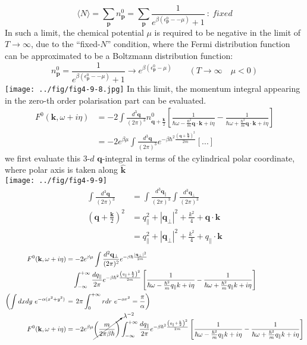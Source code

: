 \[
\langle N\rangle=\sum_{\mathbf p} n^0_{\mathbf p}=\sum_{\mathbf p}\frac{1}{e^{\beta(\epsilon^0_{\mathbf p}--\mu)}+1}\ :\ fixed
\]
 In such a limit, the chemical potential $\mu$ is required to be negative in the limit of $T\to \infty$, due to the ``fixed-$N$'' condition, where the Fermi distribution function can be approximated to be a Boltzmann distribution function:
\[
n^0_{\mathbf p}=\frac{1}{e^{\beta(\epsilon^0_{\mathbf p}--\mu)}+1}\to e^{\beta(\epsilon^0_{\mathbf p}-\mu)} \qquad (T\to \infty\quad \mu<0)
\]
\texttt{[image: ../fig/fig4-9-8.jpg]}
 In this limit, the momentum integral appearing in the zero-th order polarisation part can be evaluated.
\begin{equation}
\begin{aligned}
F^0(\mathbf k,\omega+i\eta)&=-2\int \frac{d^3\mathbf q}{(2\pi)^3} n^0_{\mathbf q+\frac{\mathbf k}{2}} \left[ \frac{1}{\hbar \omega-\frac{\hbar^2}{m} \mathbf q\cdot\mathbf k+i\eta}-\frac{1}{\hbar \omega+\frac{\hbar^2}{m} \mathbf q\cdot\mathbf k+i\eta} \right]\\
&=-2e^{\beta\mu} \int \frac{d^3\mathbf q}{(2\pi)^3}e^{-\beta\hbar^2 \frac{\left(\mathbf q+\frac{\mathbf k}{2}\right)^2}{2m}}[...]
\end{aligned}
\end{equation}
we first evaluate this $3$-$d$ $\mathbf q$-integral in terms of the cylindrical polar coordinate, where polar axis is taken along $\hat{\mathbf k}$\\
\texttt{[image: ../fig/fig4-9-9]}\\
\[
\begin{aligned}
\int \frac{d^3\mathbf q}{(2\pi)^3}&=\int \frac{d^3\mathbf q_\parallel}{(2\pi)^3} \int \frac{d^3\mathbf q_\perp}{(2\pi)^3}\\
\left(\mathbf q+\frac{\mathbf k}{2}\right)^2&=q_\parallel^2+|\mathbf q_\perp|^2+\frac{k^2}{4}+\mathbf q\cdot\mathbf k\\
&=q_\parallel^2+|\mathbf q_\perp|^2+\frac{k^2}{4}+q_\parallel\cdot\mathbf k
\end{aligned}
\]
\[
\begin{aligned}
F^0(\mathbf k,\omega+i\eta)&=-2e^{\beta\mu} \int \frac{d^2\mathbf q_\perp}{(2\pi)^2}e^{-\beta\hbar\frac{|\mathbf q_\perp|^2}{2m}}\\
&\quad \int_{-\infty}^{+\infty} \frac{d q_\parallel}{2\pi} e^{-\beta\hbar^2 \frac{\left(q_\parallel+\frac{ k}{2}\right)^2}{2m}}
\left[ \frac{1}{\hbar \omega-\frac{\hbar^2}{m} q_\parallel k+i\eta}-\frac{1}{\hbar \omega+\frac{\hbar^2}{m}  q_\parallel  k+i\eta} \right]\\
\left( \int dxdy\ e^{-\alpha(x^2+y^2)}\right. &=\left.2\pi \int_0^{+\infty} rdr\ e^{-\alpha r^2}=\frac{\pi}{\alpha} \right)\\
F^0(\mathbf k,\omega+i\eta)&=-2e^{\beta\mu} \cancelto{\lambda^{-2}}{\left( \frac{m}{2\pi\beta\hbar} \right)} \int_{-\infty}^{+\infty} \frac{d q_\parallel}{2\pi} e^{-\beta\hbar^2 \frac{\left(q_\parallel+\frac{ k}{2}\right)^2}{2m}}
\left[ \frac{1}{\hbar \omega-\frac{\hbar^2}{m} q_\parallel  k+i\eta}-\frac{1}{\hbar \omega+\frac{\hbar^2}{m}  q_\parallel  k+i\eta} \right]
\end{aligned}
\]
